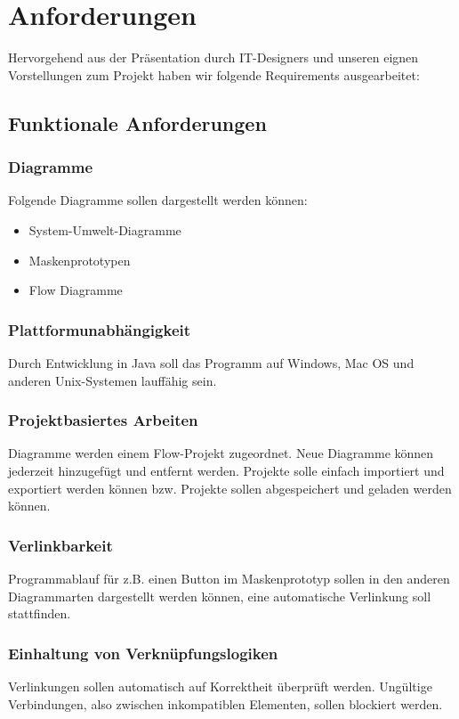 \section{Anforderungen}
Hervorgehend aus der Präsentation durch IT-Designers und unseren eignen Vorstellungen zum Projekt haben wir folgende Requirements ausgearbeitet:

\subsection{Funktionale Anforderungen}

\subsubsection{Diagramme}
Folgende Diagramme sollen dargestellt werden können:
\begin{itemize}
	\item System-Umwelt-Diagramme
	\item Maskenprototypen
	\item Flow Diagramme
\end{itemize}

\subsubsection{Plattformunabhängigkeit}
Durch Entwicklung in Java soll das Programm auf Windows, Mac OS und anderen Unix-Systemen lauffähig sein.

\subsubsection{Projektbasiertes Arbeiten}
Diagramme werden einem Flow-Projekt zugeordnet. Neue Diagramme können jederzeit hinzugefügt und entfernt werden.
Projekte solle einfach importiert und exportiert werden können bzw. Projekte sollen abgespeichert und geladen
werden können.

\subsubsection{Verlinkbarkeit}
Programmablauf für z.B. einen Button im Maskenprototyp sollen in den anderen Diagrammarten dargestellt werden können,
eine automatische Verlinkung soll stattfinden.

\subsubsection{Einhaltung von Verknüpfungslogiken}
Verlinkungen sollen automatisch auf Korrektheit überprüft werden. Ungültige Verbindungen, also zwischen inkompatiblen
Elementen, sollen blockiert werden.

